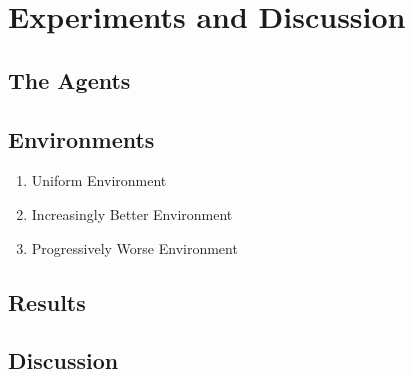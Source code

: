 \section{Experiments and Discussion}
 
\subsection{The Agents}

\subsection{Environments}

\begin{enumerate}
    \item Uniform Environment
    \item Increasingly Better Environment
    \item Progressively Worse Environment
\end{enumerate}

\subsection{Results}

\subsection{Discussion}


